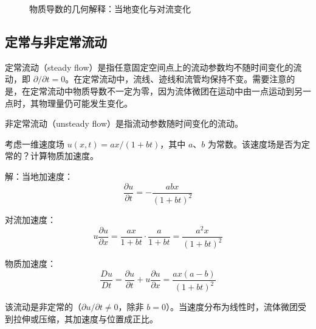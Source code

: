 \begin{figure}[H]
\centering
{}
\caption{物质导数的几何解释：当地变化与对流变化}
\label{fig:material-derivative}
\end{figure}

\subsection{定常与非定常流动}

定常流动（steady flow）是指任意固定空间点上的流动参数均不随时间变化的流动，即 \(\partial/\partial t = 0\)。在定常流动中，流线、迹线和流管均保持不变。需要注意的是，在定常流动中物质导数不一定为零，因为流体微团在运动中由一点运动到另一点时，其物理量仍可能发生变化。

非定常流动（unsteady flow）是指流动参数随时间变化的流动。

\begin{example}
考虑一维速度场 \(u(x,t) = a x / (1 + b t)\)，其中 \(a\)、\(b\) 为常数。该速度场是否为定常的？计算物质加速度。

解：当地加速度：
\[
\frac{\partial u}{\partial t} = -\frac{a b x}{(1 + b t)^2}
\]

对流加速度：
\[
u\frac{\partial u}{\partial x} = \frac{a x}{1 + b t} \cdot \frac{a}{1 + b t} = \frac{a^2 x}{(1 + b t)^2}
\]

物质加速度：
\[
\frac{Du}{Dt} = \frac{\partial u}{\partial t} + u\frac{\partial u}{\partial x} = \frac{a x (a - b)}{(1 + b t)^2}
\]

该流动是非定常的（\(\partial u/\partial t \neq 0\)，除非 \(b=0\)）。当速度分布为线性时，流体微团受到拉伸或压缩，其加速度与位置成正比。
\end{example}

